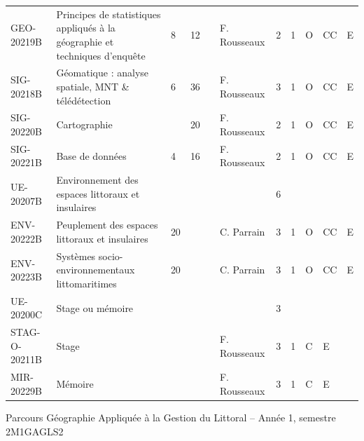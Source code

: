 \documentclass[a4paper,11pt]{article}
\begin{document}
{{\begin{tabular}{lllllllllll}
GEO-20219B    & Principes de statistiques appliqués à la géographie et techniques d'enquête    & 8  & 12 &    & F. Rousseaux    & 2    & 1    & O           & CC             & E           \\
SIG-20218B    & Géomatique : analyse spatiale, MNT \& télédétection                            & 6  & 36 &    & F. Rousseaux    & 3    & 1    & O           & CC             & E           \\
SIG-20220B    & Cartographie                                                                   &    & 20 &    & F. Rousseaux    & 2    & 1    & O           & CC             & E           \\
SIG-20221B    & Base de données                                                                & 4  & 16 &    & F. Rousseaux    & 2    & 1    & O           & CC             & E           \\
\rowcolor[HTML]{C0C0C0} 
UE-20207B     & Environnement des espaces littoraux et insulaires                              &    &    &    &                 & 6    &      &             &                &             \\
ENV-20222B    & Peuplement des espaces littoraux et insulaires                                 & 20 &    &    & C. Parrain      & 3    & 1    & O           & CC             & E           \\
ENV-20223B    & Systèmes socio-environnementaux littomaritimes                                 & 20 &    &    & C. Parrain      & 3    & 1    & O           & CC             & E           \\
\rowcolor[HTML]{C0C0C0} 
UE-20200C     & Stage ou mémoire                                                               &    &    &    &                 & 3    &      &             &                &             \\
STAG-O-20211B & Stage                                                                          &    &    &    & F. Rousseaux    & 3    & 1    & C           & E              &             \\
MIR-20229B    & Mémoire                                                                        &    &    &    & F. Rousseaux    & 3    & 1    & C           & E              &             
\end{tabular}}
}{Parcours Géographie Appliquée à la Gestion du Littoral -- Année 1, semestre 2}{M1GAGLS2}
\end{document}
